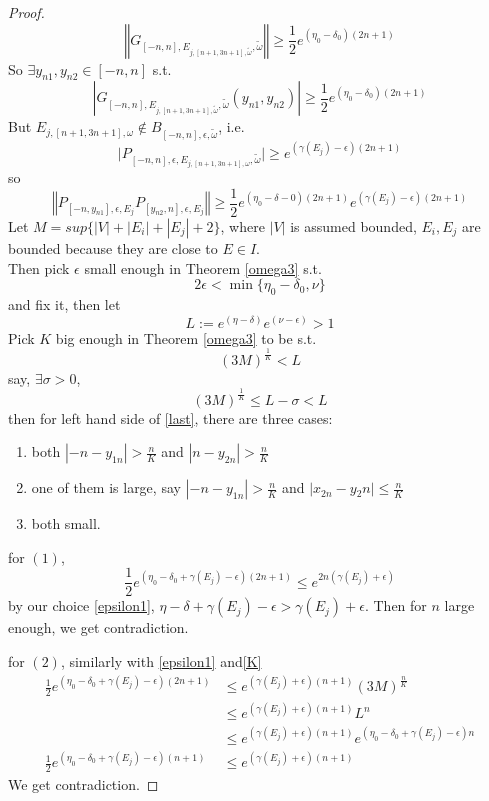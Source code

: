 \begin{proof}
\[
  \left\Vert G_{[-n,n],E_{j,[n+1,3n+1],\tilde{\omega}},\tilde{\omega}}\right\Vert\geq \frac{1}{2}e^{(\eta_0-\delta_0)(2n+1)}
\]
So $\exists y_{n1},y_{n2}\in [-n,n]$ s.t.
\[
  \left\vert G_{[-n,n],E_{j,[n+1,3n+1],\tilde{\omega}},\tilde{\omega}}(y_{n1},y_{n2})\right\vert\geq \frac{1}{2}e^{(\eta_0-\delta_0)(2n+1)}
\]
But $E_{j,[n+1,3n+1],\omega}\notin B_{[-n,n],\epsilon,\tilde{\omega}}$, i.e.
\[
\vert P_{[-n,n],\epsilon,E_{j,[n+1,3n+1],\omega},\tilde{\omega}}\vert\geq e^{(\gamma(E_j)-\epsilon)(2n+1)}
\]
so
\begin{equation}\label{last}
  \left\Vert P_{[-n,y_{n1}],\epsilon,E_j}P_{[y_{n2},n],\epsilon,E_j}\right\Vert\geq\frac{1}{2}e^{(\eta_0-\delta-0)(2n+1)}e^{(\gamma(E_j)-\epsilon)(2n+1)}
\end{equation}
Let $M= sup\{|V|+|E_i|+|E_j|+2\}$, where $|V|$ is assumed bounded, $E_i,E_j$ are bounded because they are close to $E\in I$.\\
Then pick $\epsilon$ small enough in Theorem \ref{omega3} s.t.
  \begin{equation}\label{epsilon1}
    2\epsilon<\min\{\eta_0-\delta_0,\nu\}
  \end{equation}
and fix it, then let
  \[L:=e^{(\eta-\delta)}e^{(\nu-\epsilon)}>1\]
Pick $K$ big enough in Theorem \ref{omega3} to be s.t.
  \[(3M)^{\frac{1}{K}}<L\]
say, $\exists \sigma>0$,
\begin{equation}\label{K}
(3M)^{\frac{1}{K}}\leq L-\sigma<L
\end{equation}
then for left hand side of \eqref{last}, there are three cases:
\begin{enumerate}
  \item both $|-n-y_{1n}|>\frac{n}{K}$ and $|n-y_{2n}|>\frac{n}{K}$
  \item one of them is large, say $|-n-y_{1n}|>\frac{n}{K}$ and $|x_{2n}-y{_2n}|\leq\frac{n}{K}$
  \item both small.
\end{enumerate}

for $(1)$,
\[
\frac{1}{2}e^{(\eta_0-\delta_0+\gamma(E_j)-\epsilon)(2n+1)}\leq e^{2n(\gamma(E_j)+\epsilon)}
\]
by our choice \eqref{epsilon1},
 $\eta-\delta+\gamma(E_j)-\epsilon>\gamma(E_j)+\epsilon$. Then for $n$ large enough, we get contradiction.

for $(2)$, similarly with \eqref{epsilon1} and\eqref{K}
\[
  \begin{aligned}
    \frac{1}{2}e^{(\eta_0-\delta_0+\gamma(E_j)-\epsilon)(2n+1)}
    &\leq e^{(\gamma(E_j)+\epsilon)(n+1)}(3M)^{\frac{n}{K}}\\
    &\leq e^{(\gamma(E_j)+\epsilon)(n+1)} L^n\\
    &\leq e^{(\gamma(E_j)+\epsilon)(n+1)} e^{(\eta_0-\delta_0+\gamma(E_j)-\epsilon)n}\\
    \frac{1}{2}e^{(\eta_0-\delta_0+\gamma(E_j)-\epsilon)(n+1)}
    &\leq e^{(\gamma(E_j)+\epsilon)(n+1)}
  \end{aligned}
\]
We get contradiction.


\end{proof}

